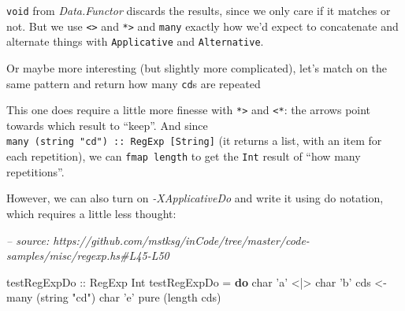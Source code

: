 \documentclass[]{article}
\newenvironment{Shaded}{}{}
\newcommand{\CharTok}[1]{\textcolor[rgb]{0.25,0.44,0.63}{#1}}
\newcommand{\CommentTok}[1]{\textcolor[rgb]{0.38,0.63,0.69}{\textit{#1}}}
\newcommand{\DataTypeTok}[1]{\textcolor[rgb]{0.56,0.13,0.00}{#1}}
\newcommand{\FunctionTok}[1]{\textcolor[rgb]{0.02,0.16,0.49}{#1}}
\newcommand{\KeywordTok}[1]{\textcolor[rgb]{0.00,0.44,0.13}{\textbf{#1}}}
\newcommand{\NormalTok}[1]{#1}
\newcommand{\OtherTok}[1]{\textcolor[rgb]{0.00,0.44,0.13}{#1}}
\newcommand{\StringTok}[1]{\textcolor[rgb]{0.25,0.44,0.63}{#1}}
\begin{document}
\texttt{void} from \emph{Data.Functor} discards the results, since we only care
if it matches or not. But we use \texttt{\textless{}\textbar{}\textgreater{}}
and \texttt{*\textgreater{}} and \texttt{many} exactly how we'd expect to
concatenate and alternate things with \texttt{Applicative} and
\texttt{Alternative}.

Or maybe more interesting (but slightly more complicated), let's match on the
same pattern and return how many \texttt{cd}s are repeated

\begin{Shaded}
\end{Shaded}

This one does require a little more finesse with \texttt{*\textgreater{}} and
\texttt{\textless{}*}: the arrows point towards which result to ``keep''. And
since \texttt{many\ (string\ "cd")\ ::\ RegExp\ {[}String{]}} (it returns a
list, with an item for each repetition), we can \texttt{fmap\ length} to get the
\texttt{Int} result of ``how many repetitions''.

However, we can also turn on \emph{-XApplicativeDo} and write it using do
notation, which requires a little less thought:

\begin{Shaded}
\begin{Highlighting}[]
\CommentTok{-- source: https://github.com/mstksg/inCode/tree/master/code-samples/misc/regexp.hs#L45-L50}

\OtherTok{testRegExpDo ::} \DataTypeTok{RegExp} \DataTypeTok{Int}
\NormalTok{testRegExpDo }\FunctionTok{=} \KeywordTok{do}
\NormalTok{    char }\CharTok{'a'} \FunctionTok{<|>}\NormalTok{ char }\CharTok{'b'}
\NormalTok{    cds }\OtherTok{<-}\NormalTok{ many (string }\StringTok{"cd"}\NormalTok{)}
\NormalTok{    char }\CharTok{'e'}
    \FunctionTok{pure}\NormalTok{ (}\FunctionTok{length}\NormalTok{ cds)}
\end{Highlighting}
\end{Shaded}
\end{document}
